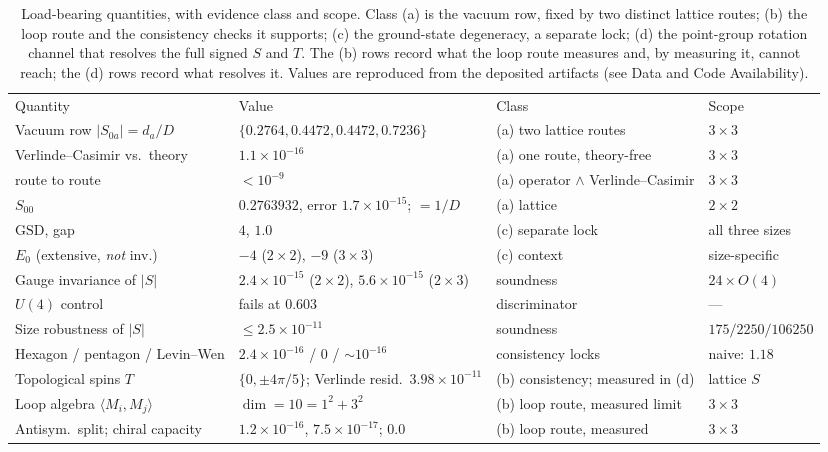 \documentclass[aps,pra,twocolumn,superscriptaddress,longbibliography,floatfix,nofootinbib]{revtex4-2}
\begin{document}
\begin{table}[tp]
\caption{\label{tab:numbers}Load-bearing quantities, with evidence class and
scope. Class (a) is the vacuum row, fixed by two distinct lattice routes; (b)
the loop route and the consistency checks it supports; (c) the ground-state
degeneracy, a separate lock; (d) the point-group rotation channel that resolves
the full signed $S$ and $T$. The (b) rows record what the loop route measures
and, by measuring it, cannot reach; the (d) rows record what resolves it.
Values are reproduced from the deposited artifacts (see Data and Code
Availability).}
\begin{ruledtabular}
\scriptsize
\begin{tabular}{llll}
Quantity & Value & Class & Scope \\
\colrule
Vacuum row $|S_{0a}|=d_a/D$ & $\{0.2764,0.4472,0.4472,0.7236\}$ & (a) two lattice routes & $3\times3$ \\
\quad Verlinde--Casimir vs.\ theory & $1.1\times10^{-16}$ & (a) one route, theory-free & $3\times3$ \\
\quad route to route & $<10^{-9}$ & (a) operator $\wedge$ Verlinde--Casimir & $3\times3$ \\
$S_{00}$ & $0.2763932$, error $1.7\times10^{-15}$; $=1/D$ & (a) lattice & $2\times2$ \\
$\mathrm{GSD}$, gap & $4$, $1.0$ & (c) separate lock & all three sizes \\
$E_0$ (extensive, \emph{not} inv.) & $-4$ ($2\times2$), $-9$ ($3\times3$) & (c) context & size-specific \\
Gauge invariance of $|S|$ & $2.4\times10^{-15}$ ($2\times2$), $5.6\times10^{-15}$ ($2\times3$) & soundness & $24\times O(4)$ \\
$U(4)$ control & fails at $0.603$ & discriminator & --- \\
Size robustness of $|S|$ & $\le2.5\times10^{-11}$ & soundness & $175/2250/106250$ \\
Hexagon / pentagon / Levin--Wen & $2.4\times10^{-16}$ / $0$ / ${\sim}10^{-16}$ & consistency locks & naive: $1.18$ \\
\colrule
Topological spins $T$ & $\{0,\pm4\pi/5\}$; Verlinde resid.\ $3.98\times10^{-11}$ & (b) consistency; measured in (d) & lattice $S$ \\
Loop algebra $\langle M_i,M_j\rangle$ & $\dim=10=1^{2}+3^{2}$ & (b) loop route, measured limit & $3\times3$ \\
Antisym.\ split; chiral capacity & $1.2\times10^{-16}$, $7.5\times10^{-17}$; $0.0$ & (b) loop route, measured & $3\times3$ \\

\end{tabular}
\end{ruledtabular}
\end{table}
\end{document}
